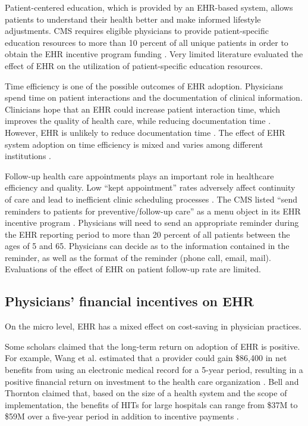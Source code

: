 \documentclass[12pt]{report}
\begin{document}
Patient-centered education, which is provided by an EHR-based system, allows patients to understand their health better and make informed lifestyle adjustments. CMS requires eligible physicians to provide patient-specific education resources to more than 10 percent of all unique patients in order to obtain the EHR incentive program funding \citep{healthit05}. Very limited literature evaluated the effect of EHR on the utilization of patient-specific education resources. 

Time efficiency is one of the possible outcomes of EHR adoption. Physicians spend time on patient interactions and the documentation of clinical information. Clinicians hope that an EHR could increase patient interaction time, which improves the quality of health care, while reducing documentation time \citep{leung2003incentives}. However, EHR is unlikely to reduce documentation time \citep{poissant2005impact}. The effect of EHR system adoption on time efficiency is mixed and varies among different institutions \citep{makoul2001use, Chaudhry2006}. 

Follow-up health care appointments plays an important role in healthcare efficiency and quality. Low ``kept appointment'' rates adversely affect continuity of care and lead to inefficient clinic scheduling processes \citep{myers2001strategies}. The CMS listed ``send reminders to patients for preventive/follow-up care'' as a menu object in its EHR incentive program \citep{cmsincentive14}. Physicians will need to send an appropriate reminder during the EHR reporting period to more than 20 percent of all patients between the ages of 5 and 65. Physicians can decide as to the information contained in the reminder, as well as the format of the reminder (phone call, email, mail). Evaluations of the effect of EHR on patient follow-up rate are limited.

\subsection{Physicians' financial incentives on EHR}
On the micro level, EHR has a mixed effect on cost-saving in physician practices.

Some scholars claimed that the long-term return on adoption of EHR is positive. For example, Wang et al. estimated that a provider could gain \$86,400 in net benefits from using an electronic medical record for a 5-year period, resulting in a positive financial return on investment to the health care organization \citep{Wang2003}. Bell and Thornton claimed that, based on the size of a health system and the scope of implementation, the benefits of HITs for large hospitals can range from \$37M to \$59M over a five-year period in addition to incentive payments \citep{Bell2011}.
\end{document}
